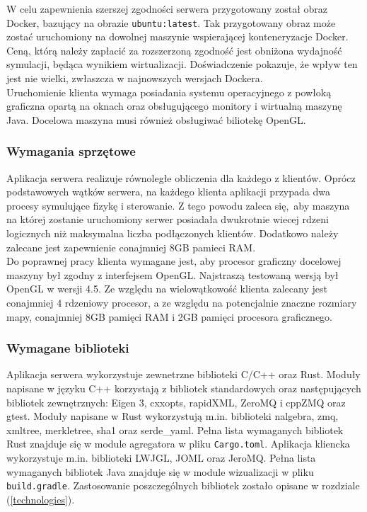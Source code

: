 \documentclass[15pt]{sprawozdanie}
\begin{document}
W celu zapewnienia szerszej zgodności serwera przygotowany został obraz Docker, bazujący na obrazie \texttt{ubuntu:latest}. Tak przygotowany obraz może zostać uruchomiony na dowolnej maszynie wspierającej konteneryzacje Docker. Ceną, którą należy zapłacić za rozszerzoną zgodność jest obniżona wydajność symulacji, będąca wynikiem wirtualizacji. Doświadczenie pokazuje, że wpływ ten jest nie wielki, zwłaszcza w najnowszych wersjach Dockera.\\

 Uruchomienie klienta wymaga posiadania systemu operacyjnego z powłoką graficzna opartą na oknach oraz obsługującego monitory i wirtualną maszynę Java. Docelowa maszyna musi również obsługiwać biliotekę OpenGL.


\subsubsection{Wymagania sprzętowe}

Aplikacja serwera realizuje równoległe obliczenia dla każdego z klientów. Oprócz podstawowych wątków serwera, na każdego klienta aplikacji przypada dwa procesy symulujące fizykę i sterowanie. Z tego powodu zaleca się, aby maszyna na której zostanie uruchomiony serwer posiadała dwukrotnie wiecej rdzeni logicznych niż maksymalna liczba podłączonych klientów. Dodatkowo należy zalecane jest zapewnienie conajmniej 8GB pamieci RAM. \\

Do poprawnej pracy klienta wymagane jest, aby procesor graficzny docelowej maszyny był zgodny z interfejsem OpenGL. Najstraszą testowaną wersją był OpenGL w wersji 4.5. Ze względu na wielowątkowość klienta zalecany jest conajmniej 4 rdzeniowy procesor, a ze względu na potencjalnie znaczne rozmiary mapy, conajmniej 8GB pamięci RAM i 2GB pamięci procesora graficznego.

\subsubsection{Wymagane biblioteki} \label{libraries}

Aplikacja serwera wykorzystuje zewnetrzne biblioteki C/C++ oraz Rust. Moduły napisane w języku C++ korzystają z bibliotek standardowych oraz następujących bibliotek zewnętrznych: Eigen 3, cxxopts, rapidXML, ZeroMQ i cppZMQ oraz gtest.
Moduły napisane w Rust wykorzystują m.in. biblioteki nalgebra, zmq, xmltree, merkletree, sha1 oraz serde\_yaml. Pełna lista wymaganych bibliotek Rust znajduje się w module agregatora w pliku \texttt{Cargo.toml}.
Aplikacja kliencka wykorzystuje m.in. biblioteki LWJGL, JOML oraz JeroMQ. Pełna lista wymaganych bibliotek Java znajduje się w module wizualizacji w pliku \texttt{build.gradle}.  Zastosowanie poszczególnych bibliotek zostało opisane w rozdziale (\ref{technologies}).
\end{document}
